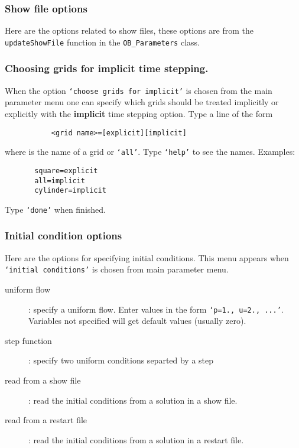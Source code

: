  \subsubsection{Show file options}
   Here are the options related to show files, these options are from the {\tt updateShowFile} function
   in the {\tt OB\_Parameters} class.
 
 

\subsubsection{Choosing grids for implicit time stepping.}\label{sec:implicitMenu}
 

  When the option {\tt `choose grids for implicit'} is chosen from the main parameter menu one can
  specify which grids should be treated implicitly or explicitly with the {\bf implicit} time stepping
  option. Type a line of the form
  \begin{verbatim}
           <grid name>=[explicit][implicit] 
  \end{verbatim}
  where {\tt <grid name>} is the name of a grid or {\tt `all'}. Type {\tt `help'} to see the names.
  Examples:
  \begin{verbatim}
       square=explicit
       all=implicit
       cylinder=implicit
  \end{verbatim}
  Type {\tt `done'} when finished.
\subsubsection{Initial condition options}\label{sec:icMenu}
 

 Here are the options for specifying initial conditions.
 This menu appears when {\tt `initial conditions'} is chosen from main parameter menu.
\begin{description}
  \item[uniform flow] : specify a uniform flow. Enter values in the form {\tt `p=1., u=2., ...'}.
     Variables not specified will get default values (usually zero).
  \item[step function] : specify two uniform conditions separted by a step
  \item[read from a show file] : read the initial conditions from a solution in a show file.
  \item[read from a restart file] : read the initial conditions from a solution in a restart file.
 \end{description}

